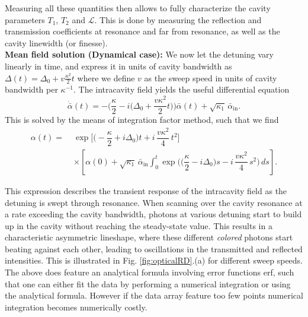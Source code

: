 Measuring all these quantities then allows to fully characterize the cavity parameters $T_1$, $T_2$ and $\mathcal{L}$. This is done by measuring the reflection and transmission coefficients at resonance and far from resonance, as well as the cavity linewidth (or finesse). \\ 



\noindent \textbf{Mean field solution (Dynamical case): } 
We now let the detuning vary linearly in time, and express it in units of cavity bandwidth as $\Delta(t)= \Delta_0 + v \frac{\kappa^2}{2}t$ where we define $v$ as the sweep speed in units of cavity bandwidth per $\kappa^{-1}$. The intracavity field yields the useful differential equation
\begin{equation}
  \dot{\bar{\alpha}}(t) = -\Bigg(\frac{\kappa}{2} - i\Big(\Delta_0 + \frac{v \kappa^2}{2}t\Big)\Bigg) \bar{\alpha}(t) + \sqrt{\kappa_1} \, \bar{\alpha}_{\mathrm{in}}.
  \label{eq:dyn_cav}
\end{equation} 
This is solved by the means of integration factor method, such that we find
\begin{equation}
\begin{split}
\alpha(t) =\;
& \exp\!\Bigg[ \Big(-\dfrac{\kappa}{2} + i\Delta_{0}\Big)t
+ i\,\dfrac{v\kappa^{2}}{4}\,t^{2} \Bigg] \\
& \times \left[
\alpha(0) + \sqrt{\kappa_{1}}\,\bar{\alpha}_{\mathrm{in}}
\int_{0}^{t} \exp\!\Bigg( \Big(\dfrac{\kappa}{2}-i\Delta_{0}\Big)s
- i\,\dfrac{v\kappa^{2}}{4}\,s^{2} \Bigg)\,ds
\right].
\end{split}
\end{equation}


This expression describes the transient response of the intracavity field as the detuning is swept through resonance. When scanning over the cavity resonance at a rate exceeding the cavity bandwidth, photons at various detuning start to build up in the cavity without reaching the steady-state value. This results in a characteristic asymmetric lineshape, where these different \textit{colored} photons start beating against each other, leading to oscillations in the transmitted and reflected intensities. This is illustrated in Fig. \ref{fig:opticalRD}.(a) for different sweep speeds. The above does feature an analytical formula involving error functions erf, such that one can either fit the data by performing a numerical integration or using the analytical formula. However if the data array feature too few points numerical integration becomes numerically costly.  \\


